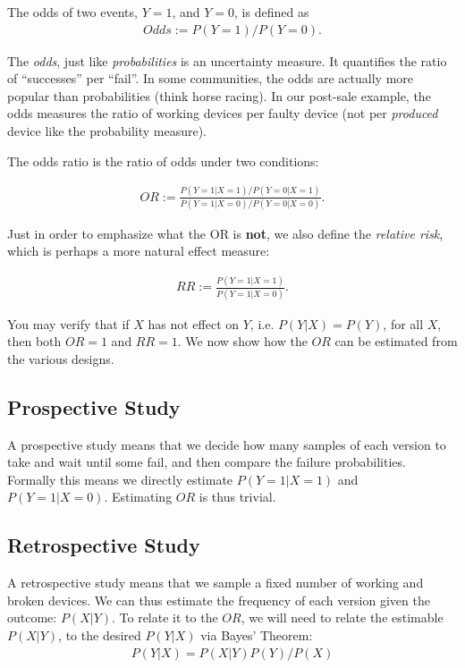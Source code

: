 \begin{definition}[Odds]
	The odds of two events, $Y=1$, and $Y=0$, is defined as 
	\begin{align}
	Odds:= P(Y=1)/P(Y=0).
	\end{align}
\end{definition}
The \emph{odds}, just like \emph{probabilities} is an uncertainty measure. 
It quantifies the ratio of ``successes'' per ``fail''. 
In some communities, the odds are actually more popular than probabilities (think horse racing).
In our post-sale example, the odds measures the ratio of working devices per faulty device (not per \emph{produced} device like the probability measure). 



The odds ratio is the ratio of odds under two conditions: 
\begin{definition}
	\begin{align}
	OR := \frac{P(Y=1|X=1) / P(Y=0|X=1)}{P(Y=1|X=0) / P(Y=0|X=0)}.
	\end{align}
\end{definition}
Just in order to emphasize what the OR is \textbf{not}, we also define the \emph{relative risk}, which is perhaps a more natural effect measure:
\begin{definition}
	\begin{align}
	RR := \frac{P(Y=1|X=1)}{P(Y=1|X=0)}.
	\end{align}
\end{definition}
You may verify that if $X$ has not effect on $Y$, i.e. $P(Y|X)=P(Y)$, for all $X$, then both $OR=1$ and $RR=1$. 
We now show how the $OR$ can be estimated from the various designs. 


\subsection{Prospective Study} 
A prospective study means that we decide how many samples of each version to take and wait until some fail, and then compare the failure probabilities. 
Formally this means we directly estimate $P(Y=1|X=1)$ and $P(Y=1|X=0)$.
Estimating $OR$ is thus trivial.






\subsection{Retrospective Study}
A retrospective study means that we sample a fixed number of working and broken devices. 
We can thus estimate the frequency of each version given the outcome: $P(X|Y)$.
To relate it to the $OR$, we will need to relate the estimable $P(X|Y)$, to the desired $P(Y|X)$ via Bayes' Theorem: 
\begin{align}
\label{eq:bayes}
	P(Y|X)=P(X|Y)P(Y)/P(X)
\end{align}

